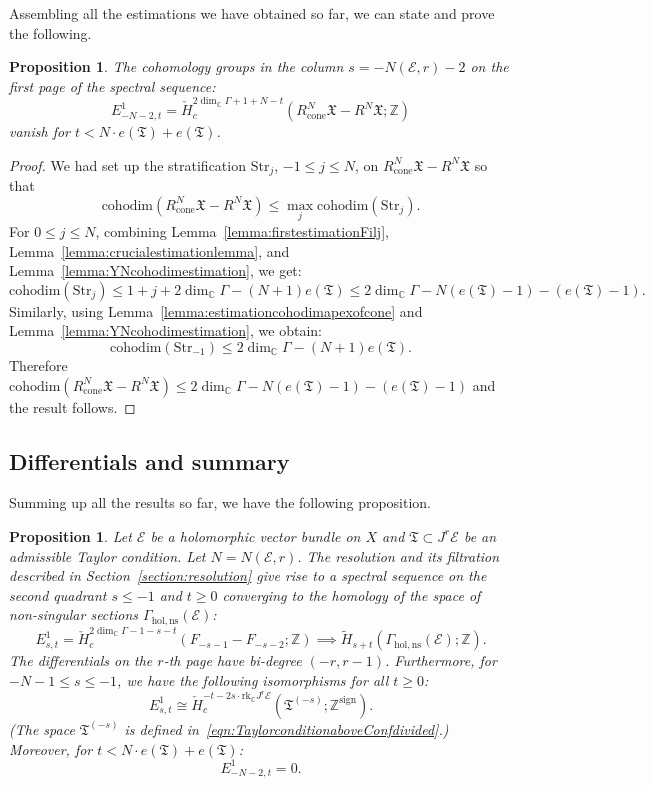 \documentclass[a4paper]{amsart}
\newcommand{\bZ}{\mathbb Z}
\newcommand{\bC}{\mathbb C}
\newcommand{\cE}{\mathcal E}
\newcommand{\fX}{\mathfrak X}
\newcommand{\fT}{\mathfrak T}
\theoremstyle{plain}
\newtheorem{proposition}[theorem]{Proposition}
\theoremstyle{definition}
\newcommand{\CCH}{\check{H}_{c}}
\newcommand{\rank}{\mathrm{rk}}
\newcommand{\Str}{\mathrm{Str}}
\newcommand{\cohodim}{\mathrm{cohodim}}
\begin{document}
Assembling all the estimations we have obtained so far, we can state and prove the following.
\begin{proposition}\label{prop:lastcolumnvanishingrange}
The cohomology groups in the column $s = - N(\cE,r) - 2$ on the first page of the spectral sequence:
\[
    E^1_{-N-2,t} = \CCH^{2\dim_\bC \Gamma + 1+N - t}(R^N_\text{cone}\fX - R^N\fX; \bZ)
\]
vanish for $t < N\cdot e(\fT) + e(\fT)$.
\end{proposition}
\begin{proof}
We had set up the stratification $\Str_j$, $-1 \leq j \leq N$, on $R^N_\text{cone}\fX - R^N\fX$ so that
\[
    \cohodim\left( R^N_\text{cone}\fX - R^N\fX \right) \leq \max_{j} \cohodim\left( \Str_j \right).
\]
For $0 \leq j \leq N$, combining Lemma~\ref{lemma:firstestimationFilj}, Lemma~\ref{lemma:crucialestimationlemma}, and Lemma~\ref{lemma:YNcohodimestimation}, we get:
\[
    \cohodim\left( \Str_j \right) \leq 1+j + 2\dim_\bC \Gamma -(N+1)e(\fT)  \leq 2\dim_\bC \Gamma - N(e(\fT)-1) - (e(\fT)-1).
\]
Similarly, using Lemma~\ref{lemma:estimationcohodimapexofcone} and Lemma~\ref{lemma:YNcohodimestimation}, we obtain:
\[
    \cohodim\left( \Str_{-1} \right) \leq 2 \dim_\bC \Gamma - (N+1) e(\fT).
\]
Therefore $\cohodim\left( R^N_\text{cone}\fX - R^N\fX \right) \leq 2\dim_\bC \Gamma - N(e(\fT)-1) - (e(\fT)-1)$ and the result follows.
\end{proof}



\subsection{Differentials and summary}\label{subsection:differentialsummary}

Summing up all the results so far, we have the following proposition. 
\begin{proposition}\label{prop:summingUPresolutionandSS}
Let $\cE$ be a holomorphic vector bundle on $X$ and $\fT \subset J^r\cE$ be an admissible Taylor condition. Let $N = N(\cE,r)$. The resolution and its filtration described in Section~\ref{section:resolution} give rise to a spectral sequence on the second quadrant $s \leq -1$ and $t \geq 0$ converging to the homology of the space of non-singular sections $\Gamma_{\mathrm{hol, ns}}(\cE)$:
\[
    E^1_{s,t} = \CCH^{2\dim_\bC \Gamma - 1 - s - t}(F_{-s-1} - F_{-s-2}; \bZ) \implies \widetilde{H}_{s+t}(\Gamma_{\mathrm{hol, ns}}(\cE); \bZ).
\]
The differentials on the $r$-th page have bi-degree $(-r,r-1)$. Furthermore, for $-N-1 \leq s \leq -1$, we have the following isomorphisms for all $t \geq 0$:
\[
    E^1_{s,t} \cong \CCH^{-t - 2s \cdot \rank_\bC J^r\cE}(\fT^{(-s)}; \bZ^\mathrm{sign}).
\]
(The space $\fT^{(-s)}$ is defined in~\eqref{eqn:TaylorconditionaboveConfdivided}.) Moreover, for $t < N\cdot e(\fT) + e(\fT)$:
\[
    E^1_{-N-2,t} = 0.
\]
\end{proposition}
\end{document}
